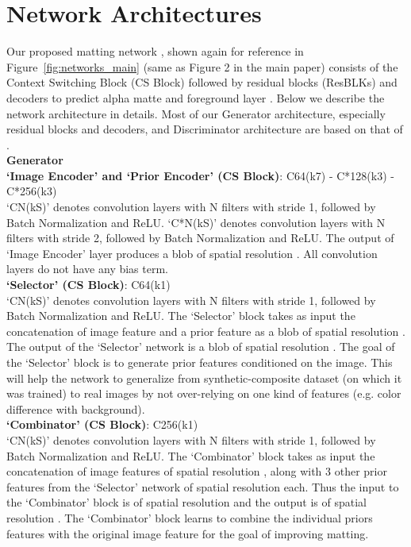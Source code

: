 \documentclass[10pt,twocolumn,letterpaper]{article}
\begin{document}
\section{Network Architectures}
\label{sec:arch}

Our proposed matting network , shown again for reference in Figure~\ref{fig:networks_main} (same as Figure 2 in the main paper) consists of the Context Switching Block (CS Block) followed by residual blocks (ResBLKs) and decoders to predict alpha matte  and foreground layer . Below we describe the network architecture in details. Most of our Generator architecture, especially residual blocks and decoders, and Discriminator architecture are based on that of \cite{zhu2017unpaired}.
\\
\noindent
\textbf{Generator \\}
\noindent
\textbf{`Image Encoder' and `Prior Encoder' (CS Block)}: C64(k7) - C*128(k3) - C*256(k3)\\
`CN(kS)' denotes convolution layers with N  filters with stride 1, followed by Batch Normalization and ReLU. `C*N(kS)' denotes convolution layers with N  filters with stride 2, followed by Batch Normalization and ReLU. The output of `Image Encoder' layer produces a blob of spatial resolution . All convolution layers do not have any bias term.\\
\noindent
\textbf{`Selector' (CS Block)}: C64(k1)\\
`CN(kS)' denotes convolution layers with N  filters with stride 1, followed by Batch Normalization and ReLU. The `Selector' block takes as input the concatenation of image feature and a prior feature as a blob of spatial resolution . The output of the `Selector' network is a blob of spatial resolution . The goal of the `Selector' block is to generate prior features conditioned on the image. This will help the network to generalize from synthetic-composite dataset (on which it was trained) to real images by not over-relying on one kind of features (e.g. color difference with background).\\
\noindent
\textbf{`Combinator' (CS Block)}: C256(k1)\\
`CN(kS)' denotes convolution layers with N  filters with stride 1, followed by Batch Normalization and ReLU. The `Combinator' block takes as input the concatenation of image features of spatial resolution , along with 3 other prior features from the `Selector' network of spatial resolution  each. Thus the input to the `Combinator' block is of spatial resolution  and the output is of spatial resolution . The `Combinator' block learns to combine the individual priors features with the original image feature for the goal of improving matting.\\
\end{document}
